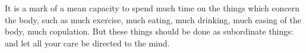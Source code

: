 It is a mark of a mean capacity  to spend much time on the things which concern
the body, such as much exercise, much eating, much drinking, much easing of the
body, much copulation.  But these things should be done  as subordinate things:
and let all your care be directed to the mind.
